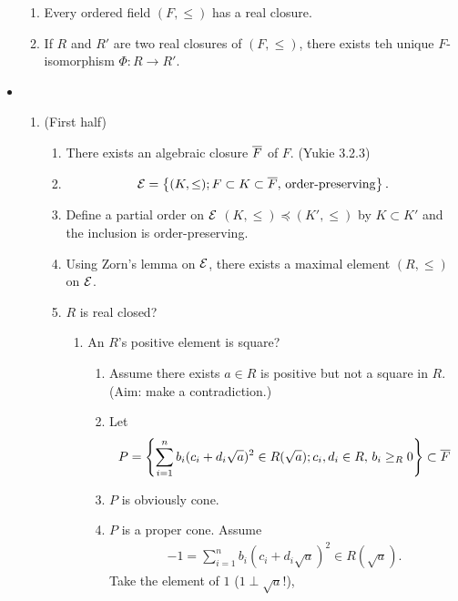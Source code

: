 \documentclass[9pt]{ltjsarticle}
\begin{document}
\begin{itemize}
  \begin{enumerate}
    \item Every ordered field $(F,\le)$ has a real closure.
    \item If $R$ and $R'$ are two real closures of $(F,\le)$,
    there exists teh unique $F$-isomorphism $\varPhi\colon R\to R'$.
  \end{enumerate}
  \item
  \pf
  \begin{enumerate}
    \item (First half)
    \begin{enumerate}
      \item There exists an algebraic closure $\ol F$ of $F$.  (Yukie 3.2.3)
      \item
      \begin{align}
        \cal E =
        \set{(K,\le); F\subset K \subset \ol F,\, \text{order-preserving}}.
      \end{align}
      \item
      Define a partial order on $\cal E$ $(K,\le) \preceq (K',\le)$
      by $K\subset K'$ and the inclusion is order-preserving.
      \item
      Using Zorn's lemma on $\cal E$,
      there exists a maximal element $(R,\le)$ on $\cal E$.
      \item
      $R$ is real closed?
      \begin{enumerate}
        \item An $R$'s positive element is square?
        \begin{enumerate}
          \item Assume there exists $a \in R$ is positive but not a square in $R$.
          (Aim: make a contradiction.)
          \item
          Let
          \begin{align}
            P = \set{\sum_{i=1}^n b_i(c_i+d_i\sqrt{a})^2 \in R(\sqrt{a});
            c_i,d_i\in R,\, b_i \ge_R 0 } \subset \ol F
          \end{align}
          \item
          $P$ is obviously cone.
          \item
          $P$ is a proper cone.
          \pf
          Assume
          \begin{align}
            -1 = \sum_{i=1}^n b_i(c_i+d_i\sqrt{a})^2 \in R(\sqrt{a}).
          \end{align}
          Take the element of $1$ ($1 \perp \sqrt{a}$!),
          \begin{align}

\end{align}
\end{enumerate}
\end{enumerate}
\end{enumerate}
\end{enumerate}
\end{itemize}
\end{document}
